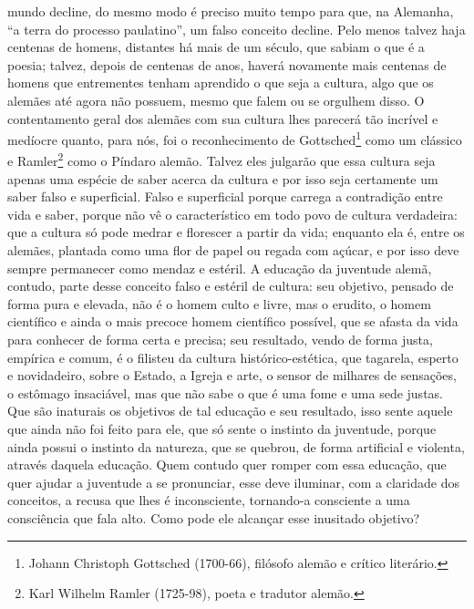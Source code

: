     mundo decline, do mesmo modo é preciso muito tempo para que, na
    Alemanha, ``a terra do processo paulatino'', um falso conceito
    decline. Pelo menos talvez haja centenas de homens, distantes há
    mais de um século, que sabiam o que é a poesia; talvez, depois de
    centenas de anos, haverá novamente mais centenas de homens que
    entrementes tenham aprendido o que seja a cultura, algo que os
    alemães até agora não possuem, mesmo que falem ou se orgulhem disso.
    O contentamento geral dos alemães com sua cultura lhes parecerá tão
    incrível e medíocre quanto, para nós, foi o reconhecimento de
    Gottsched\footnote{Johann Christoph Gottsched (1700-66), filósofo
      alemão e crítico literário.} como um clássico e Ramler\footnote{Karl
      Wilhelm Ramler (1725-98), poeta e tradutor alemão.} como o Píndaro
    alemão. Talvez eles julgarão que essa cultura seja apenas uma
    espécie de saber acerca da cultura e por isso seja certamente um
    saber falso e superficial. Falso e superficial porque carrega a
    contradição entre vida e saber, porque não vê o característico em
    todo povo de cultura verdadeira: que a cultura só pode medrar e
    florescer a partir da vida; enquanto ela é, entre os alemães,
    plantada como uma flor de papel ou regada com açúcar, e por isso
    deve sempre permanecer como mendaz e estéril. A educação da
    juventude alemã, contudo, parte desse conceito falso e estéril de
    cultura: seu objetivo, pensado de forma pura e elevada, não é o
    homem culto e livre, mas o erudito, o homem científico e ainda o
    mais precoce homem científico possível, que se afasta da vida para
    conhecer de forma certa e precisa; seu resultado, vendo de forma
    justa, empírica e comum, é o filisteu da cultura histórico-estética,
    que tagarela, esperto e novidadeiro, sobre o Estado, a Igreja e
    arte, o sensor de milhares de sensações, o estômago insaciável, mas
    que não sabe o que é uma fome e uma sede justas. Que são inaturais
    os objetivos de tal educação e seu resultado, isso sente aquele que
    ainda não foi feito para ele, que só sente o instinto da juventude,
    porque ainda possui o instinto da natureza, que se quebrou, de forma
    artificial e violenta, através daquela educação. Quem contudo quer
    romper com essa educação, que quer ajudar a juventude a se
    pronunciar, esse deve iluminar, com a claridade dos conceitos, a
    recusa que lhes é inconsciente, tornando-a consciente a uma
    consciência que fala alto. Como pode ele alcançar esse inusitado
    objetivo?

